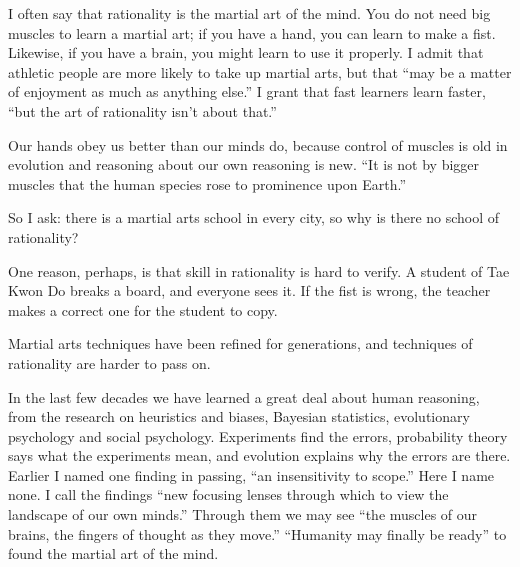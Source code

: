 
I often say that rationality is the martial art of the mind. You do not need big muscles to learn a martial art; if you have a hand, you can learn to make a fist. Likewise, if you have a brain, you might learn to use it properly. I admit that athletic people are more likely to take up martial arts, but that ``may be a matter of enjoyment as much as anything else.'' I grant that fast learners learn faster, ``but the art of rationality isn't about that.'' 

Our hands obey us better than our minds do, because control of muscles is old in evolution and reasoning about our own reasoning is new. ``It is not by bigger muscles that the human species rose to prominence upon Earth.'' 

So I ask: there is a martial arts school in every city, so why is there no school of rationality? 

One reason, perhaps, is that skill in rationality is hard to verify. A student of Tae Kwon Do breaks a board, and everyone sees it. If the fist is wrong, the teacher makes a correct one for the student to copy. 

Martial arts techniques have been refined for generations, and techniques of rationality are harder to pass on. 

In the last few decades we have learned a great deal about human reasoning, from the research on heuristics and biases, Bayesian statistics, evolutionary psychology and social psychology. Experiments find the errors, probability theory says what the experiments mean, and evolution explains why the errors are there. Earlier I named one finding in passing, ``an insensitivity to scope.'' Here I name none. I call the findings ``new focusing lenses through which to view the landscape of our own minds.'' Through them we may see ``the muscles of our brains, the fingers of thought as they move.'' ``Humanity may finally be ready'' to found the martial art of the mind.

